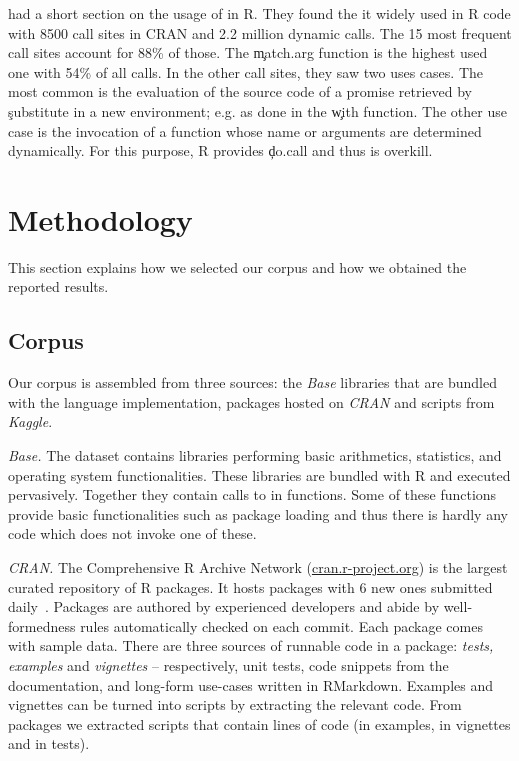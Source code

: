 \documentclass[screen,acmsmall]{acmart}
\newcommand{\mypara}[1]{\medskip\noindent\emph{#1}\xspace}
\begin{document}
\citet{ecoop12} had a short section on the usage of \eval in R. They found the
it widely used in R code with 8500 call sites in CRAN and 2.2 million dynamic
calls. The 15 most frequent call sites account for 88\% of those. The
\c{match.arg} function is the highest used one with 54\% of all calls. In the
other call sites, they saw two uses cases. The most common is the evaluation of
the source code of a promise retrieved by \c{substitute} in a new environment;
e.g. as done in the \c{with} function. The other use case is the invocation of a
function whose name or arguments are determined dynamically. For this purpose, R
provides \c{do.call} and thus \eval is overkill.


\newpage
\section{Methodology}

This section explains how we selected our corpus and how we obtained the
reported results.

\subsection{Corpus}

Our corpus is assembled from three sources: the \emph{Base} libraries that are
bundled with the language implementation, packages hosted on \emph{CRAN} and
scripts from \emph{Kaggle}.

\mypara{Base.} The dataset contains \BasePackages libraries performing basic
arithmetics, statistics, and operating system functionalities. These libraries
are bundled with R and executed pervasively. Together they contain
\BaseEvalCallSites calls to \eval in \BaseFunsWithEvals functions. Some of these
functions provide basic functionalities such as package loading and thus there
is hardly any code which does not invoke one of these.

\mypara{CRAN.} The Comprehensive R Archive Network
(\small{\url{cran.r-project.org}}) is the largest curated repository of R
packages. It hosts \CranAvailablePackagesRnd packages with 6 new ones submitted
daily~\cite{Ligges2017}. Packages are authored by experienced developers and
abide by well-formedness rules automatically checked on each commit.
Each package comes with sample data. There are three sources of
runnable code in a package: \emph{tests, examples} and \emph{vignettes} --
respectively, unit tests, code snippets from the documentation, and long-form
use-cases written in RMarkdown. Examples and vignettes can be turned into
scripts by extracting the relevant code. From \CranPackages packages we
extracted \CranRunnableScripts scripts that contain \CranRunnableCode lines of
code (\CranRunnableCodeExamplesRnd in examples, \CranRunnableCodeVignettesRnd in
vignettes and \CranRunnableCodeTestsRnd in tests).
\end{document}
